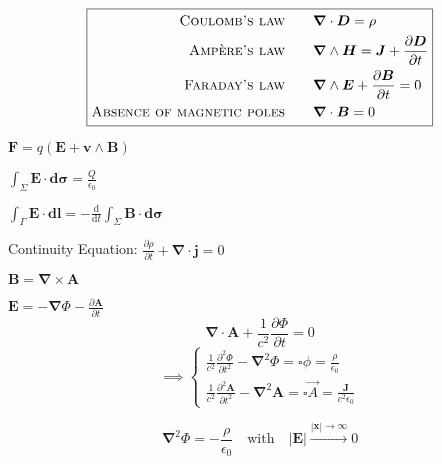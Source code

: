 $$\boxed{\begin{split}
	\textsc{Coulomb's law} \qquad &\boldsymbol{\nabla} \cdot \boldsymbol{D} = \rho\\
	\textsc{Ampère's law} \qquad &\boldsymbol{\nabla} \wedge \boldsymbol{H} = \boldsymbol{J} + \frac{\partial \boldsymbol{D}}{\partial t}\\
	\textsc{Faraday's law} \qquad &\boldsymbol{\nabla} \wedge \boldsymbol{E} + \frac{\partial \boldsymbol{B}}{\partial t} = 0\\
	\textsc{Absence of magnetic poles} \qquad &\boldsymbol{\nabla} \cdot \boldsymbol{B} = 0
	\end{split}}$$

\squishlist
\item $ \boldsymbol{F} = q(\boldsymbol{E}+\boldsymbol{v} \wedge \boldsymbol{B}) $

\item $ \int_{\Sigma}\boldsymbol{E} \cdot \boldsymbol{d\sigma} = \frac{Q}{\epsilon_0}$

\item $\int_{\Gamma} \boldsymbol{E} \cdot \boldsymbol{dl} = -\frac{\text{d}}{\text{d}t}\int_{\Sigma} \boldsymbol{B} \cdot \boldsymbol{d\sigma}$

\item Continuity Equation: $\frac{\partial \rho}{\partial t} + \boldsymbol{\nabla}\cdot\boldsymbol{j} = 0$
\squishend

\squishlist
\item $\boldsymbol{B} = \boldsymbol{\nabla} \times \boldsymbol{A}$

\item $\boldsymbol{E} = -\boldsymbol{\nabla} \Phi - \frac{\partial \boldsymbol{A}}{\partial t}$
\squishend
{}
$$
\boldsymbol{\nabla} \cdot \boldsymbol{A} + \frac{1}{c^2}\frac{\partial \Phi}{\partial t}=0
$$
\[      \implies
        \begin{cases}
            \frac{1}{c^2}\frac{\partial^2 \Phi }{\partial t^2} - \boldsymbol{\nabla}^2 \Phi = \square \phi = \frac{\rho}{\epsilon_0} \\
            \frac{1}{c^2}\frac{\partial^2 \boldsymbol{A}}{\partial t^2} - \boldsymbol{\nabla}^2 \boldsymbol{A} = \square \vec{A} =  \frac{\boldsymbol{J}}{c^2\epsilon_0}
        \end{cases}
\]

$$
\boldsymbol{\nabla}^2\Phi = -\frac{\rho}{\epsilon_0} \quad \text{with} \quad |\boldsymbol{E}| \overset{|\boldsymbol{x}|\to \infty}{\longrightarrow} 0
$$

